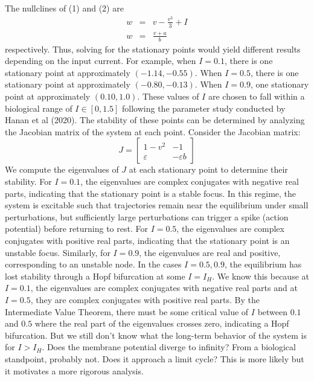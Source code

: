 \documentclass{article}
\begin{document}
The nullclines of (1) and (2) are
\begin{eqnarray}
    w&=&v-\frac{v^3}{3}+I \\
    w&=&\frac{v+a}{b}
\end{eqnarray}
respectively. Thus, solving for the stationary points would yield different results depending on the input current. For example, when $I=0.1$, there is one stationary point at approximately $(-1.14, -0.55)$. When $I=0.5$, there is one stationary point at approximately $(-0.80, -0.13)$. When $I=0.9$, one stationary point at approximately $(0.10, 1.0)$. These values of $I$ are chosen to fall within a biological range of $I\in [0,1.5]$ following the parameter study conducted by Hanan et al (2020). \cite{hanan2020} The stability of these points can be determined by analyzing the Jacobian matrix of the system at each point. Consider the Jacobian matrix:
\begin{equation}
    J=\begin{bmatrix}1-v^2 & -1 \\
\varepsilon & -\varepsilon b\end{bmatrix}
\end{equation}
We compute the eigenvalues of $J$ at each stationary point to determine their stability. For $I=0.1$, the eigenvalues are 
complex conjugates with negative real parts, indicating that the stationary point is a stable focus. In this regime, the 
system is excitable such that trajectories remain near the equilibrium under small perturbations, but sufficiently large 
perturbations can trigger a spike (action potential) before returning to rest. For $I=0.5$, the eigenvalues are complex 
conjugates with positive real parts, indicating that the stationary point is an unstable focus. Similarly, for $I=0.9$, 
the eigenvalues are real and positive, corresponding to an unstable node. In the cases $I=0.5,0.9$, the equilibrium has 
lost stability through a Hopf bifurcation at some $I=I_H$. We know this because at $I=0.1$, the eigenvalues are complex 
conjugates with negative real parts and at $I=0.5$, they are complex conjugates with positive real parts. By the 
Intermediate Value Theorem, there must be some critical value of $I$ between $0.1$ and $0.5$ where the real part of the 
eigenvalues crosses zero, indicating a Hopf bifurcation. But we still don't know what the long-term behavior of the system is for $I>I_H$. Does the membrane potential diverge to 
infinity? From a biological standpoint, probably not. Does it approach a limit cycle? This is more likely but it motivates a more rigorous analysis.
\end{document}
